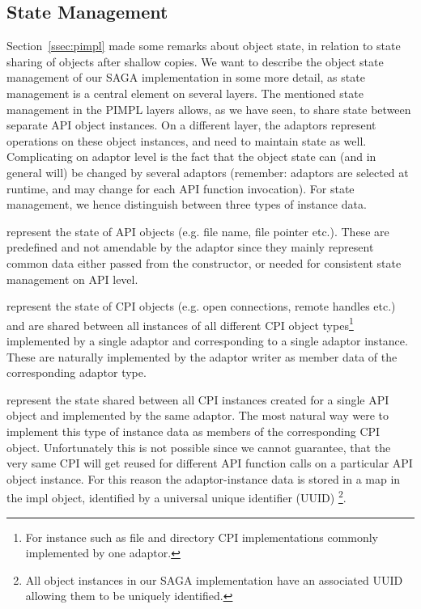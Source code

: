 \subsection{State Management}

Section~\ref{ssec:pimpl} made some remarks about object state, in relation to
state sharing of objects after shallow copies.  We want to describe the object
state management of our SAGA implementation in some more detail, as state
management is a central element on several layers.  The mentioned state
management in the PIMPL layers allows, as we have seen, to share state between
separate API object instances.   On a different layer, the adaptors represent
operations on these object instances, and need to maintain state as well.
Complicating on adaptor level is the fact that the object state can (and in
general will) be changed by several adaptors (remember: adaptors are selected
at runtime, and may change for each API function invocation).  For state 
management, we hence distinguish between three types of instance data.

\begin{shortlist}
	\item {} represent the state of API objects (e.g. file name, 
			file pointer etc.). These are predefined and not amendable by the adaptor
			since they mainly represent common data either passed from the constructor,
			or needed for consistent state management on API level.
	\item {} represent the state of CPI objects (e.g. open connections, 
			remote handles etc.) and are shared between all instances of all different 
			CPI object types\footnote{\small{For instance such as file and directory 
			CPI implementations commonly implemented by one adaptor.}} implemented by 
			a single adaptor and corresponding to a single adaptor instance. These are 
			naturally implemented by the adaptor writer as member data of the corresponding 
			adaptor type.
	\item {} represent the state shared between all CPI 
			instances created for a single API object and implemented by the same 
			adaptor. The most natural way were to implement this type of instance 
			data as members of the corresponding CPI object. Unfortunately this is 
			not possible since we cannot guarantee, that the very same CPI 
			will get reused for different API function calls on a particular API object 
			instance. For this reason the adaptor-instance data is stored in a
			map in the impl object, identified by a universal unique identifier (UUID)
			\footnote{\small{All object instances in our SAGA implementation have 
			an associated UUID allowing them to be uniquely identified.}}.
\end{shortlist}

